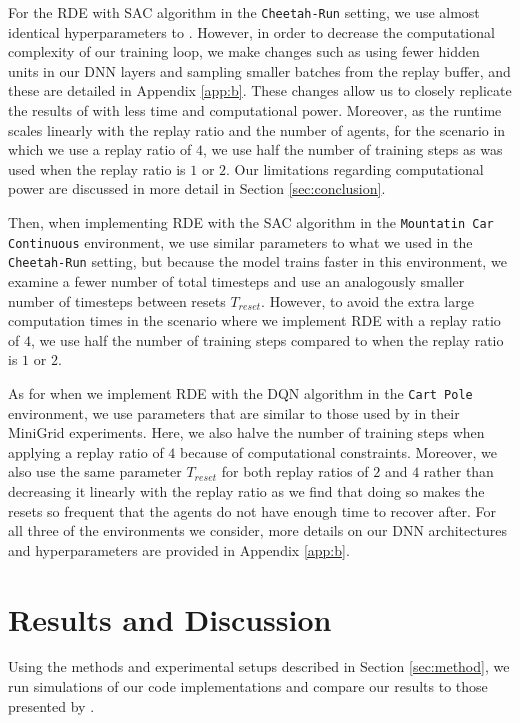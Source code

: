 \documentclass[base]{subfiles}
\begin{document}
For the RDE with SAC algorithm in the \texttt{Cheetah-Run} setting, we use almost identical hyperparameters to \cite{kim2023}.
However, in order to decrease the computational complexity of our training loop, we make changes such as using fewer hidden units in our DNN layers and sampling smaller batches from the replay buffer, and these are detailed in Appendix \ref{app:b}.
These changes allow us to closely replicate the results of \cite{kim2023} with less time and computational power.
Moreover, as the runtime scales linearly with the replay ratio and the number of agents, for the scenario in which we use a replay ratio of $4$, we use half the number of training steps as was used when the replay ratio is $1$ or $2$.
Our limitations regarding computational power are discussed in more detail in Section \ref{sec:conclusion}.

Then, when implementing RDE with the SAC algorithm in the \texttt{Mountatin Car Continuous} environment, we use similar parameters to what we used in the \texttt{Cheetah-Run} setting, but because the model trains faster in this environment, we examine a fewer number of total timesteps and use an analogously smaller number of timesteps between resets $T_{reset}$.
However, to avoid the extra large computation times in the scenario where we implement RDE with a replay ratio of $4$, we use half the number of training steps compared to when the replay ratio is $1$ or $2$.

As for when we implement RDE with the DQN algorithm in the \texttt{Cart Pole} environment, we use parameters that are similar to those used by \cite{kim2023} in their MiniGrid experiments.
Here, we also halve the number of training steps when applying a replay ratio of $4$ because of computational constraints.
Moreover, we also use the same parameter $T_{reset}$ for both replay ratios of $2$ and $4$ rather than decreasing it linearly with the replay ratio as we find that doing so makes the resets so frequent that the agents do not have enough time to recover after.
For all three of the environments we consider, more details on our DNN architectures and hyperparameters are provided in Appendix \ref{app:b}.

\section{Results and Discussion}
\label{sec:results}

Using the methods and experimental setups described in Section \ref{sec:method}, we run simulations of our code implementations and compare our results to those presented by \cite{kim2023}.
\end{document}
